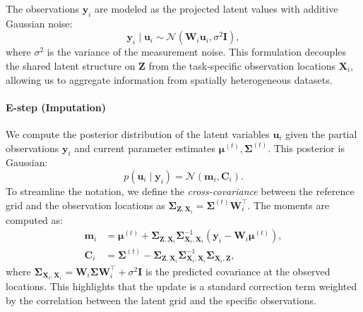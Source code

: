 \documentclass{article}
\newcommand{\bX}{\mathbf{X}}
\newcommand{\bZ}{\mathbf{Z}}
\newcommand{\bSigma}{\boldsymbol{\Sigma}}
\begin{document}
The observations $\mathbf{y}_i$ are modeled as the projected latent values with additive Gaussian noise:
\begin{equation}
\nonumber
    \mathbf{y}_i \mid \mathbf{u}_i \sim \mathcal{N}(\mathbf{W}_i \mathbf{u}_i, \sigma^2 \mathbf{I}),
\end{equation}
where $\sigma^2$ is the variance of the measurement noise.
This formulation decouples the shared latent structure on $\mathbf{Z}$ from the task-specific observation locations $\mathbf{X}_i$, allowing us to aggregate information from spatially heterogeneous datasets.

\paragraph{E-step (Imputation)}
We compute the posterior distribution of the latent variables $\mathbf{u}_i$ given the partial observations $\mathbf{y}_i$ and current parameter estimates $\boldsymbol{\mu}^{(t)}, \boldsymbol{\Sigma}^{(t)}$. This posterior is Gaussian:
\begin{equation}
\nonumber
    p(\mathbf{u}_i \mid \mathbf{y}_i) = \mathcal{N}(\mathbf{m}_i, \mathbf{C}_i).
\end{equation}
To streamline the notation, we define the \textit{cross-covariance} between the reference grid and the observation locations as $\bSigma_{\bZ, \bX_i} = \boldsymbol{\Sigma}^{(t)} \mathbf{W}_i^\top$. The moments are computed as:
\begin{equation}
\nonumber
    \begin{aligned}
            \mathbf{m}_i &= \boldsymbol{\mu}^{(t)} + \boldsymbol{\Sigma}_{\bZ, \bX_i}  \bSigma_{\bX_i, \bX_i} ^{-1} \left(
                \mathbf{y}_i - \mathbf{W}_i \boldsymbol{\mu}^{(t)}
            \right), \\
    \mathbf{C}_i &= \boldsymbol{\Sigma}^{(t)} - \boldsymbol{\Sigma}_{\bZ, \bX_i} \bSigma_{\bX_i, \bX_i}^{-1} \boldsymbol{\Sigma}_{\bX_i, \bZ},
    \end{aligned}
\end{equation}
where $\bSigma_{\bX_i, \bX_i}  = \mathbf{W}_i \bSigma \mathbf{W}_i^\top + \sigma^2 \mathbf{I}$ is the predicted covariance at the observed locations. This highlights that the update is a standard correction term weighted by the correlation between the latent grid and the specific observations.
\end{document}

